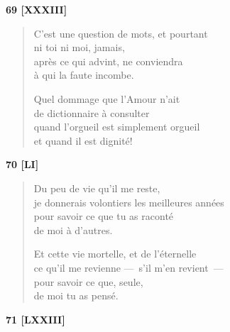 
\begin{center}
  \textbf{69 [XXXIII]}
\end{center}

\begin{verse}
  C'est une question de mots, et pourtant \\
  ni toi ni moi, jamais, \\
  après ce qui advint, ne conviendra \\
  à qui la faute incombe.

  Quel dommage que l'Amour n'ait \\
  de dictionnaire à consulter \\
  quand l'orgueil est simplement orgueil \\
  et quand il est dignité!
\end{verse}


\begin{center}
  \textbf{70 [LI]}
\end{center}

\begin{verse}
  Du peu de vie qu'il me reste, \\
  je donnerais volontiers les meilleures années \\
  pour savoir ce que tu as raconté \\
  de moi à d'autres.

  Et cette vie mortelle, et de l'éternelle \\
  ce qu'il me revienne ---~s'il m'en revient~--- \\
  pour savoir ce que, seule, \\
  de moi tu as pensé.
\end{verse}


\begin{center}
  \textbf{71 [LXXIII]}
\end{center}

